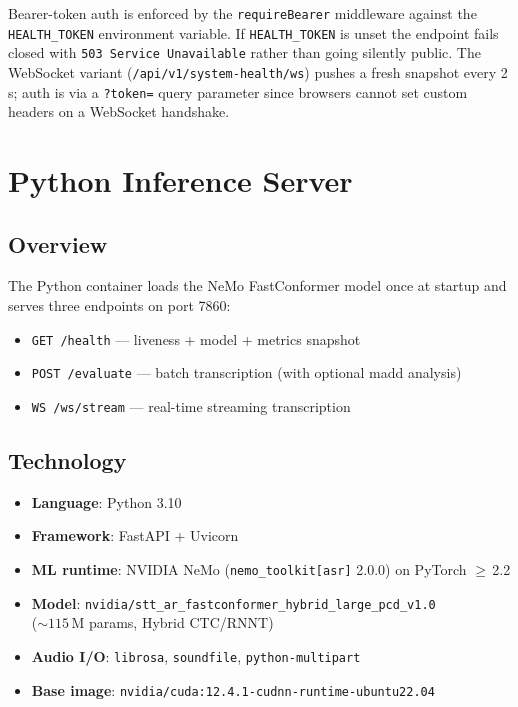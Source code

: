 Bearer-token auth is enforced by the \texttt{requireBearer} middleware against the \texttt{HEALTH\_TOKEN} environment variable. If \texttt{HEALTH\_TOKEN} is unset the endpoint fails closed with \texttt{503 Service Unavailable} rather than going silently public. The WebSocket variant (\texttt{/api/v1/system-health/ws}) pushes a fresh snapshot every 2\,s; auth is via a \texttt{?token=} query parameter since browsers cannot set custom headers on a WebSocket handshake.

\section{Python Inference Server}
\label{sec:python_inference}

\subsection{Overview}
The Python container loads the NeMo FastConformer model once at startup and serves three endpoints on port 7860:

\begin{itemize}
  \item \texttt{GET /health} --- liveness + model + metrics snapshot
  \item \texttt{POST /evaluate} --- batch transcription (with optional madd analysis)
  \item \texttt{WS /ws/stream} --- real-time streaming transcription
\end{itemize}

\subsection{Technology}
\begin{infobox}[title=Technology Stack]
\begin{itemize}
  \item \textbf{Language}: Python 3.10
  \item \textbf{Framework}: FastAPI + Uvicorn
  \item \textbf{ML runtime}: NVIDIA NeMo (\texttt{nemo\_toolkit[asr]} 2.0.0) on PyTorch ${\geq}$\,2.2
  \item \textbf{Model}: \texttt{nvidia/stt\_ar\_fastconformer\_hybrid\_large\_pcd\_v1.0} \\(${\sim}115$\,M params, Hybrid CTC/RNNT)
  \item \textbf{Audio I/O}: \texttt{librosa}, \texttt{soundfile}, \texttt{python-multipart}
  \item \textbf{Base image}: \texttt{nvidia/cuda:12.4.1-cudnn-runtime-ubuntu22.04}
\end{itemize}
\end{infobox}

